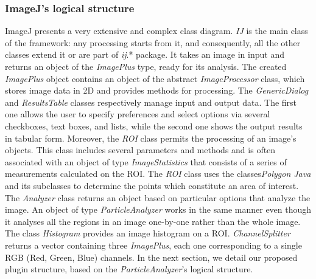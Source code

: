 \subsubsection{ImageJ's logical structure}
ImageJ presents a very extensive and complex class diagram.
\emph{IJ} is the main class of the framework: any processing starts from it, and consequently, all the other classes extend it or are part of \emph{ij}.* package. It takes an image in input and returns an object of the \emph{ImagePlus} type, ready for its analysis.
The created \emph{ImagePlus} object contains an object of the abstract \emph{ImageProcessor} class, which stores image data in 2D and provides methods for processing.
The \emph{GenericDialog} and \emph{ResultsTable} classes respectively manage input and output data. The first one allows the user to specify preferences and select options via several checkboxes, text boxes, and lists, while the second one shows the output results in tabular form. Moreover, the \emph{ROI} class permits the processing of an image's objects.
This class includes several parameters and methods and is often associated with an object of type \emph{ImageStatistics} that consists of a series of measurements calculated on the ROI. The \emph{ROI} class uses the classes\emph{Polygon Java } and its subclasses to determine the points which constitute an area of interest. The \emph{Analyzer} class returns an object based on particular options that analyze the image. An object of type \emph{ParticleAnalyzer} works in the same manner even though it analyses all the regions in an image one-by-one rather than the whole image. 
The class \emph{Histogram} provides an image histogram on a ROI. 
\emph{ChannelSplitter} returns a vector containing three \emph{ImagePlus}, each one corresponding to a single RGB (Red, Green, Blue) channels.
In the next section, we detail our proposed plugin structure, based on the \emph{ParticleAnalyzer}'s logical structure.